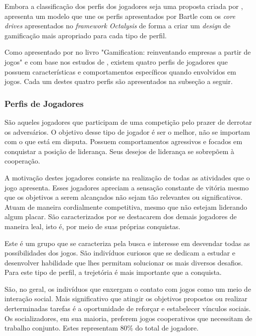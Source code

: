 
Embora a classificação dos perfis dos jogadores seja uma proposta criada por ,  apresenta um modelo
que une os perfis apresentados por Bartle com os \textit{core drives} apresentados no \textit{framework Octalysis} de forma a criar um \textit{design} de gamificação
mais apropriado para cada tipo de perfil.

Como apresentado por  no livro "Gamification: reinventando empresas a partir de jogos" e com base nos estudos de , 
existem quatro perfis de jogadores que possuem características e comportamentos específicos quando envolvidos em jogos. Cada um destes quatro perfis são apresentados na
subseção a seguir.

\subsubsection{Perfis de Jogadores}

São aqueles jogadores que participam de uma competição pelo prazer de derrotar os adversários. O objetivo desse tipo de jogador é ser o melhor, não 
se importam com o que está em disputa. Possuem comportamentos agressivos e focados em conquistar a posição de liderança. Seus desejos de liderança se 
sobrepõem à cooperação.

A motivação destes jogadores consiste na realização de todas as atividades que o jogo apresenta. Esses jogadores apreciam a sensação constante
de vitória mesmo que os objetivos a serem alcançados não sejam tão relevantes ou significativos. Atuam de maneira cordialmente competitiva, mesmo que não estejam
liderando algum placar. São caracterizados por se destacarem dos demais jogadores de maneira leal, isto é, por meio de suas próprias conquistas.

Este é um grupo que se caracteriza pela busca e interesse em desvendar todas as possibilidades dos jogos. São indivíduos curiosos que se dedicam a estudar
e desenvolver habilidade que lhes permitam solucionar os mais diversos desafios. Para este tipo de perfil, a trejetória é mais importante que a conquista.

São, no geral, os indivíduos que enxergam o contato com jogos como um meio de interação social. Mais significativo que atingir os objetivos propostos ou
realizar derterminadas tarefas é a oportunidade de reforçar e estabelecer vínculos sociais. Os socializadores, em sua maioria, preferem jogos cooperativos
que necessitam de trabalho conjunto. Estes representam 80\% do total de jogadore.

